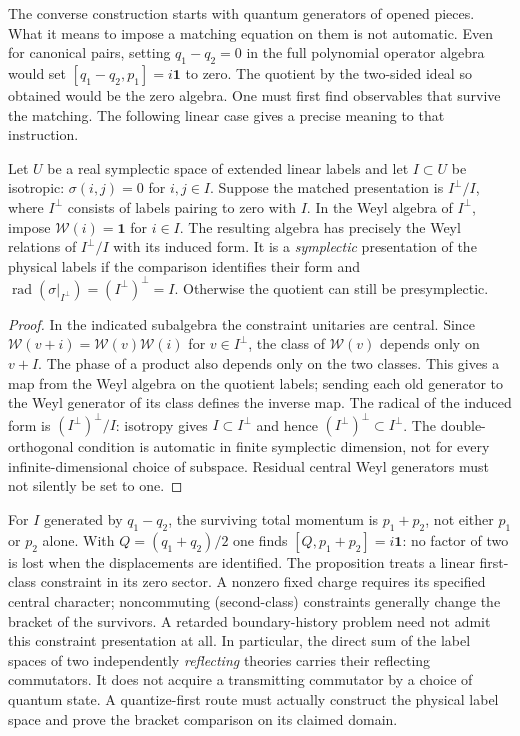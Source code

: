 The converse construction starts with quantum generators of opened pieces.
What it means to impose a matching equation on them is not automatic. Even
for canonical pairs, setting $q_1-q_2=0$ in the full polynomial operator
algebra would set $[q_1-q_2,p_1]=i\mathbf 1$ to zero. The quotient by the
two-sided ideal so obtained would be the zero algebra. One must first find
observables that survive the matching. The following linear case gives a
precise meaning to that instruction.

\begin{proposition}
Let $U$ be a real symplectic space of extended linear labels and let
$I\subset U$ be isotropic: $\sigma(i,j)=0$ for $i,j\in I$. Suppose the
matched presentation is $I^\perp/I$, where $I^\perp$ consists of labels
pairing to zero with $I$. In the Weyl algebra of $I^\perp$, impose
$\mathcal W(i)=\mathbf1$ for $i\in I$. The resulting algebra has precisely
the Weyl relations of $I^\perp/I$ with its induced form. It is a
\emph{symplectic} presentation of the physical labels if the comparison
identifies their form and
$\operatorname{rad}(\sigma|_{I^\perp})=(I^\perp)^\perp=I$. Otherwise
the quotient can still be presymplectic.
\end{proposition}
\begin{proof}
In the indicated subalgebra the constraint unitaries are central. Since
$\mathcal W(v+i)=\mathcal W(v)\mathcal W(i)$ for $v\in I^\perp$, the
class of $\mathcal W(v)$ depends only on $v+I$. The phase of a product
also depends only on the two classes. This gives a map from the Weyl
algebra on the quotient labels; sending each old generator to the Weyl
generator of its class defines the inverse map. The radical of the induced
form is $(I^\perp)^\perp/I$: isotropy gives $I\subset I^\perp$ and hence
$(I^\perp)^\perp\subset I^\perp$. The double-orthogonal condition is
automatic in finite symplectic dimension, not for every infinite-dimensional
choice of subspace. Residual central Weyl generators must not silently be
set to one.
\end{proof}

For $I$ generated by $q_1-q_2$, the surviving total momentum is
$p_1+p_2$, not either $p_1$ or $p_2$ alone. With
$Q=(q_1+q_2)/2$ one finds $[Q,p_1+p_2]=i\mathbf1$: no factor of two is
lost when the displacements are identified. The proposition treats a
linear first-class constraint in its zero sector. A nonzero fixed charge
requires its specified central character; noncommuting (second-class)
constraints generally change the bracket of the survivors. A retarded
boundary-history problem need not admit this constraint presentation at
all. In particular, the direct sum of the label spaces of two independently
\emph{reflecting} theories carries their reflecting commutators. It does
not acquire a transmitting commutator by a choice of quantum state. A
quantize-first route must actually construct the physical label space and
prove the bracket comparison on its claimed domain.

